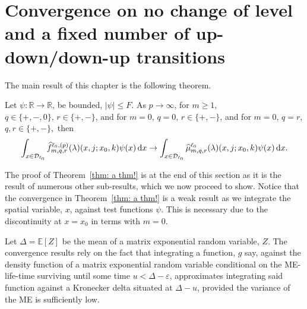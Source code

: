 \section{Convergence on no change of level and a fixed number of up-down/down-up transitions}\label{sec: no change convergence}
The main result of this chapter is the following theorem.
\begin{thm}\label{thm: a thm!}
	Let \(\psi:\mathbb R\to\mathbb R\), be bounded, \(|\psi|\leq F\). As \(p\to \infty\), for \(m\geq 1\), \(q\in\{+,-,0\},\, r\in\{+,-\}\), and for \(m=0\), \(q=0\), \(r\in\{+,-\}\), and for \(m=0\), \(q=r\), \(q,r\in\{+,-\},\) then
	\begin{align}\int_{x\in\mathcal{D}_{\ell_0}}\widehat f_{m,q,r}^{\ell_0,(p)}(\lambda)(x,j;x_0,k)\psi(x)\, \mathrm{d} x \to \int_{x\in\mathcal{D}_{\ell_0}}\widehat \mu_{m,q,r}^{\ell_0}(\lambda)(x,j;x_0,k)\psi(x)\, \mathrm{d} x.\label{eqn: thm 2}\end{align}
\end{thm}
The proof of Theorem~\ref{thm: a thm!} is at the end of this section as it is the result of numerous other sub-results, which we now proceed to show. Notice that the convergence in Theorem~\ref{thm: a thm!} is a weak result as we integrate the spatial variable, \(x\), against test functions \(\psi\). This is necessary due to the discontinuity at \(x=x_0\) in terms with \(m=0\).

Let \(\Delta = \mathbb E[Z]\) be the mean of a matrix exponential random variable, \(Z\). The convergence results rely on the fact that integrating a function, \(g\) say, against the density function of a matrix exponential random variable conditional on the ME-life-time surviving until some time \(u<\Delta-\varepsilon\), approximates integrating said function against a Kronecker delta situated at \(\Delta-u\), provided the variance of the ME is sufficiently low. 

